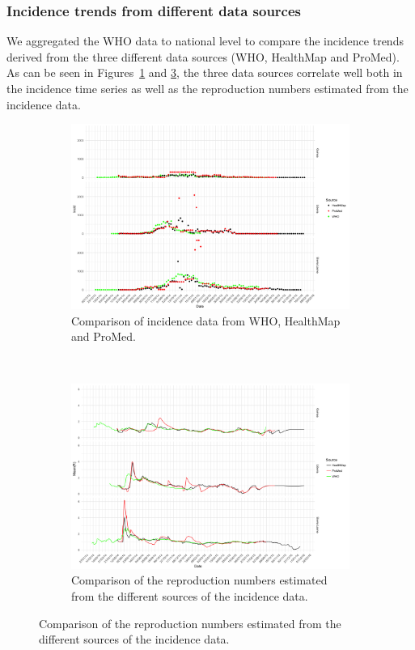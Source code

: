 \documentclass[11pt,]{article}
\begin{document}
\subsubsection{Incidence trends from different data sources}
We aggregated the WHO data to national level to compare the incidence
trends derived from the three different data sources (WHO, HealthMap
and ProMed). As can be seen in Figures~\ref{fig:incid_comp} and \ref{fig:r_comp}, the
three data sources correlate well both in the incidence time series as
well as the reproduction numbers estimated from the incidence data.
\begin{figure}
    \centering
    \begin{subfigure}[b]{0.8\textwidth}
        \includegraphics[width=\textwidth]{ms6-figures/who_vs_hm_vs_pm-incid}
        \caption{Comparison of incidence data from WHO, HealthMap and ProMed.}
        \label{fig:incid_comp}
      \end{subfigure}
      ~
    \begin{subfigure}[b]{0.8\textwidth}
        \includegraphics[width=\textwidth]{ms6-figures/who_vs_hm_vs_pm-R}
        \caption{Comparison of the reproduction numbers estimated from
        the different sources of the incidence data.}
        \label{fig:r_comp}
    \end{subfigure}
  \end{figure}
\end{document}
